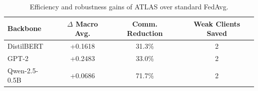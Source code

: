 \begin{table}[t]
\centering
\caption{Efficiency and robustness gains of ATLAS over standard FedAvg.}
\label{tab:efficiency_summary}
\begin{tabular}{lccc}
\toprule
\textbf{Backbone} & $\Delta$ Macro Avg. & Comm. Reduction & Weak Clients Saved \\
\midrule
DistilBERT & +0.1618 & 31.3\% & 2 \\
GPT-2 & +0.2483 & 33.0\% & 2 \\
Qwen-2.5-0.5B & +0.0686 & 71.7\% & 2 \\
\bottomrule
\end{tabular}
\end{table}
